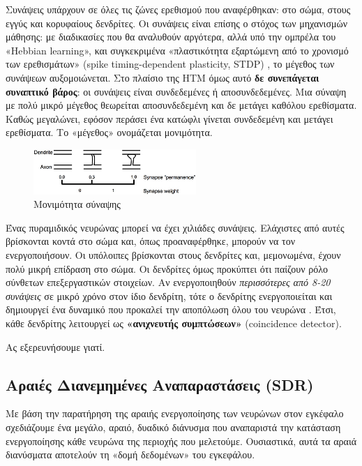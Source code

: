 	Συνάψεις υπάρχουν σε όλες τις ζώνες ερεθισμού που αναφέρθηκαν:
	στο σώμα, στους εγγύς και κορυφαίους δενδρίτες.
	Οι συνάψεις είναι επίσης ο στόχος των μηχανισμών μάθησης: με διαδικασίες που θα αναλυθούν αργότερα, αλλά υπό την ομπρέλα του «Hebbian learning»,
	και συγκεκριμένα «πλαστικότητα εξαρτώμενη από το χρονισμό των ερεθισμάτων» (spike timing-dependent plasticity, STDP) \parencite{songCompetitiveHebbianLearning2000},
	το μέγεθος των συνάψεων αυξομοιώνεται.
	Στο πλαίσιο της HTM όμως αυτό \textbf{δε συνεπάγεται συναπτικό βάρος}: οι συνάψεις είναι συνδεδεμένες ή αποσυνδεδεμένες.
	Μια σύναψη με πολύ μικρό μέγεθος θεωρείται αποσυνδεδεμένη και δε μετάγει καθόλου ερεθίσματα.
	Καθώς μεγαλώνει, εφόσον περάσει ένα κατώφλι γίνεται συνδεδεμένη και μετάγει ερεθίσματα.
	Το «μέγεθος» ονομάζεται μονιμότητα.

	\begin{figure}
		\centering
		\includegraphics[width=0.55\textwidth]{figures/synapse_permanence}
		\caption{Μονιμότητα σύναψης}
		\label{fig:synapse_permanence}
	\end{figure}

	Ένας πυραμιδικός νευρώνας μπορεί να έχει χιλιάδες συνάψεις. Ελάχιστες από αυτές βρίσκονται κοντά στο σώμα και, όπως προαναφέρθηκε, μπορούν να τον ενεργοποιήσουν.
	Οι υπόλοιπες βρίσκονται στους δενδρίτες και, μεμονωμένα, έχουν πολύ μικρή επίδραση στο σώμα.
	Οι δενδρίτες όμως προκύπτει ότι παίζουν ρόλο σύνθετων επεξεργαστικών στοιχείων.
	Αν ενεργοποιηθούν \textit{περισσότερες από 8-20 συνάψεις} σε μικρό χρόνο στον ίδιο δενδρίτη, τότε ο δενδρίτης ενεργοποιείται και δημιουργεί ένα δυναμικό που προκαλεί την αποπόλωση όλου του νευρώνα \parencite{hawkinsWhyNeuronsHave2016}.
	Έτσι, κάθε δενδρίτης λειτουργεί ως \textbf{«ανιχνευτής συμπτώσεων»} (coincidence detector).

	Ας εξερευνήσουμε γιατί.


\subsection{Αραιές Διανεμημένες Αναπαραστάσεις (SDR)} \label{htm:sdr}

	Με βάση την παρατήρηση της αραιής ενεργοποίησης των νευρώνων στον εγκέφαλο σχεδιάζουμε ένα μεγάλο, αραιό, δυαδικό διάνυσμα που αναπαριστά την κατάσταση ενεργοποίησης κάθε νευρώνα της περιοχής που μελετούμε.
	Ουσιαστικά, αυτά τα αραιά διανύσματα αποτελούν τη «δομή δεδομένων» \cite{neuronssynapses,sdrkanerva} του εγκεφάλου.

